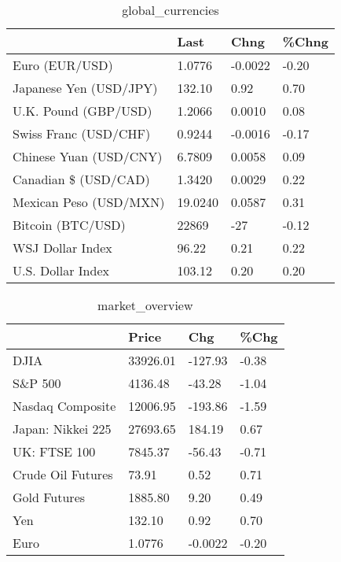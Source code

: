 \documentclass{article}%
\begin{document}
%


\begin{table}[htbp]%
\caption{global\_currencies}%
\centering%
\begin{adjustbox}{width=1\textwidth}%
\begin{tabular}{llll}
\toprule
                       &    Last &    Chng & \%Chng \\
\midrule
        Euro (EUR/USD) &  1.0776 & -0.0022 & -0.20 \\
Japanese Yen (USD/JPY) &  132.10 &    0.92 &  0.70 \\
  U.K. Pound (GBP/USD) &  1.2066 &  0.0010 &  0.08 \\
 Swiss Franc (USD/CHF) &  0.9244 & -0.0016 & -0.17 \\
Chinese Yuan (USD/CNY) &  6.7809 &  0.0058 &  0.09 \\
  Canadian \$ (USD/CAD) &  1.3420 &  0.0029 &  0.22 \\
Mexican Peso (USD/MXN) & 19.0240 &  0.0587 &  0.31 \\
     Bitcoin (BTC/USD) &   22869 &     -27 & -0.12 \\
      WSJ Dollar Index &   96.22 &    0.21 &  0.22 \\
     U.S. Dollar Index &  103.12 &    0.20 &  0.20 \\
\bottomrule
\end{tabular}
%
\end{adjustbox}%
\end{table}

%


\begin{table}[htbp]%
\caption{market\_overview}%
\centering%
\begin{adjustbox}{width=1\textwidth}%
\begin{tabular}{llll}
\toprule
                  &    Price &     Chg &  \%Chg \\
\midrule
             DJIA & 33926.01 & -127.93 & -0.38 \\
          S\&P 500 &  4136.48 &  -43.28 & -1.04 \\
 Nasdaq Composite & 12006.95 & -193.86 & -1.59 \\
Japan: Nikkei 225 & 27693.65 &  184.19 &  0.67 \\
     UK: FTSE 100 &  7845.37 &  -56.43 & -0.71 \\
Crude Oil Futures &    73.91 &    0.52 &  0.71 \\
     Gold Futures &  1885.80 &    9.20 &  0.49 \\
              Yen &   132.10 &    0.92 &  0.70 \\
             Euro &   1.0776 & -0.0022 & -0.20 \\
\bottomrule
\end{tabular}
%
\end{adjustbox}%
\end{table}

%
\end{document}
